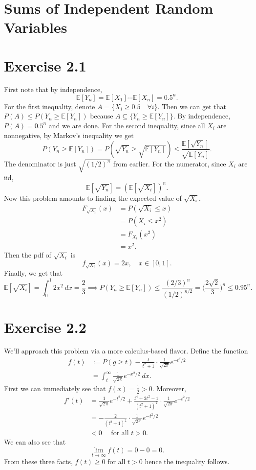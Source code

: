 \section{Sums of Independent Random Variables}

\section*{Exercise 2.1}
First note that by independence, 
\[ \mathbb{E}[Y_n] = \mathbb{E}[X_1] \cdots \mathbb{E}[X_n] = 0.5^n. \]
For the first inequality, denote $A = \{X_i \geq 0.5 \quad \forall i\}$. Then we can get that 
$P(A) \leq P(Y_n \geq \mathbb{E}[Y_n])$ because $A \subseteq \{Y_n  \geq \mathbb{E}[Y_n]\}$. By independence, 
$P(A) = 0.5^n$ and we are done. For the second inequality, since all $X_i$ are nonnegative, 
by Markov's inequality we get 
\[ P(Y_n \geq \mathbb{E}[Y_n]) = P(\sqrt{Y_n} \geq \sqrt{\mathbb{E}[Y_n]}) 
\leq \frac{\mathbb{E}[\sqrt{Y_n}]}{\sqrt{\mathbb{E}[Y_n]}}. \]
The denominator is just $\sqrt{(1/2)^n}$ from earlier. For the numerator, since $X_i$ are iid, 
\[ \mathbb{E}[\sqrt{Y_n}] = (\mathbb{E}[\sqrt{X_i}])^n. \]
Now this problem amounts to finding the expected value of $\sqrt{X_i}$.
\begin{align*}
	F_{\sqrt{X_i}}(x) 
	&= P(\sqrt{X_i} \leq x) \\
	&= P(X_i \leq x^2) \\
	&= F_{X_i}(x^2) \\
	&= x^2.
\end{align*}
Then the pdf of $\sqrt{X_i}$ is 
\[ f_{\sqrt{X_i}}(x) = 2x, \quad x \in [0, 1]. \]
Finally, we get that 
\[ \mathbb{E}[\sqrt{X_i}] = \int_{0}^{1} 2x^2 \ dx = \frac{2}{3} 
\implies P(Y_n \geq \mathbb{E}[Y_n]) \leq \frac{(2/3)^n}{(1/2)^{n/2}} 
= \biggl( \frac{2 \sqrt{2}}{3} \biggr)^n \leq 0.95^n. \]


\newpage
\section*{Exercise 2.2}
We'll approach this problem via a more calculus-based flavor.
Define the function 
\begin{align*}
	f(t) 
	&:= P(g \geq t) - \frac{t}{t^2 + 1} \cdot \frac{1}{\sqrt{2 \pi}} e^{-t^2 / 2} \\
	&= \int_{t}^{\infty} \frac{1}{\sqrt{2 \pi}} e^{-x^2 / 2} \ dx.
\end{align*}
First we can immediately see that $f(x) = \frac{1}{2} > 0$. Moreover, 
\begin{align*}
	f'(t) 
	&= \frac{1}{\sqrt{2 \pi}}e^{-t^2 / 2} + \frac{t^4 + 2t^2 - 1}{(t^2 + 1)^2} 
	\cdot \frac{1}{\sqrt{2 \pi}} e^{-t^2 / 2} \\
	&= -\frac{2}{(t^2 + 1)^2} \cdot \frac{1}{\sqrt{2 \pi}} e^{-t^2 / 2} \\
	&< 0 \quad \text{ for all } t > 0.
\end{align*}
We can also see that 
\[ \lim_{t \to \infty} f(t) = 0 - 0 = 0. \]
From these three facts, $f(t) \geq 0$ for all $t > 0$ hence the inequality follows.


